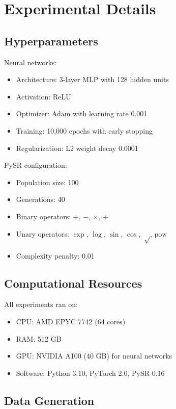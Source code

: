 \documentclass[twoside,11pt]{article}
\begin{document}
\newpage
\appendix

\section{Experimental Details}
\label{app:details}

\subsection{Hyperparameters}

Neural networks:
\begin{itemize}
\item Architecture: 3-layer MLP with 128 hidden units
\item Activation: ReLU
\item Optimizer: Adam with learning rate 0.001
\item Training: 10,000 epochs with early stopping
\item Regularization: L2 weight decay 0.0001
\end{itemize}

PySR configuration:
\begin{itemize}
\item Population size: 100
\item Generations: 40
\item Binary operators: $+$, $-$, $\times$, $\div$
\item Unary operators: $\exp$, $\log$, $\sin$, $\cos$, $\sqrt$, $\text{pow}$
\item Complexity penalty: 0.01
\end{itemize}

\subsection{Computational Resources}

All experiments ran on:
\begin{itemize}
\item CPU: AMD EPYC 7742 (64 cores)
\item RAM: 512 GB
\item GPU: NVIDIA A100 (40 GB) for neural networks
\item Software: Python 3.10, PyTorch 2.0, PySR 0.16
\end{itemize}

\subsection{Data Generation}
\end{document}
